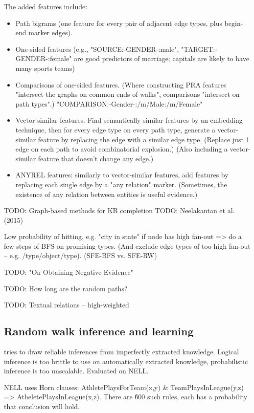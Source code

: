 The added features include:
\begin{itemize}
\item Path bigrams (one feature for every pair of adjacent
edge types, plus begin-end marker edges).
\item One-sided features (e.g., "SOURCE:-GENDER-:male", "TARGET:-GENDER-:female"
are good predictors of marriage; capitals are likely to have many sports teams)
\item Comparisons of one-sided features. (Where constructing PRA features
"intersect the graphs on common ends of walks", comparisons "intersect on
path types".) "COMPARISON:-Gender-:/m/Male:/m/Female"
\item Vector-similar features. Find semantically similar features by an
embedding technique, then for every edge type on every path type, generate
a vector-similar feature by replacing the edge with a similar edge type.
(Replace just 1 edge on each path to avoid combinatorial explosion.)
(Also including a vector-similar feature that doesn't change any edge.)
\item ANYREL features: similarly to vector-similar features, add features
by replacing each single edge by a "any relation" marker. (Sometimes, the
existence of any relation between entities is useful evidence.)
\end{itemize}

TODO: Graph-based methods for KB completion
TODO: Neelakantan et al. (2015)

Low probability of hitting, e.g. "city in state" if node has high fan-out =>
do a few steps of BFS on promising types. (And exclude edge types of too high
fan-out -- e.g. /type/object/type). (SFE-BFS vs. SFE-RW)

TODO: "On Obtaining Negative Evidence"

TODO: How long are the random paths?

TODO: Textual relations -- high-weighted

\subsection{Random walk inference and learning}

\cite{random-walk-inference} tries to draw reliable inferences from imperfectly
extracted knowledge. Logical inference is too brittle to use on automatically
extracted knowledge, probabilistic inference is too unscalable.
Evaluated on NELL.

NELL uses Horn clauses: AthletePlaysForTeam(x,y) \& TeamPlaysInLeague(y,z) =>
AtheletePlaysInLeague(x,z). There are \~600 such rules, each has a probability
that conclusion will hold.

